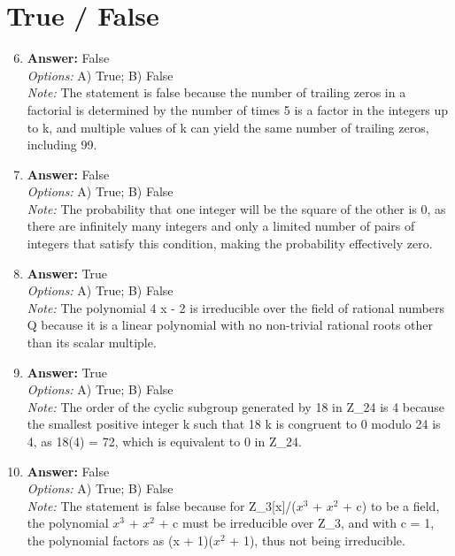 \documentclass[12pt]{article}
\begin{document}
\section*{True / False}
\begin{enumerate}[label=\arabic*.]
\setcounter{enumi}{5}
\item \textbf{Answer:} False
\\ \textit{Options:} A) True; B) False
\\ \textit{Note:} The statement is false because the number of trailing zeros in a factorial is determined by the number of times 5 is a factor in the integers up to k, and multiple values of k can yield the same number of trailing zeros, including 99.
\item \textbf{Answer:} False
\\ \textit{Options:} A) True; B) False
\\ \textit{Note:} The probability that one integer will be the square of the other is 0, as there are infinitely many integers and only a limited number of pairs of integers that satisfy this condition, making the probability effectively zero.
\item \textbf{Answer:} True
\\ \textit{Options:} A) True; B) False
\\ \textit{Note:} The polynomial 4 x - 2 is irreducible over the field of rational numbers Q because it is a linear polynomial with no non-trivial rational roots other than its scalar multiple.
\item \textbf{Answer:} True
\\ \textit{Options:} A) True; B) False
\\ \textit{Note:} The order of the cyclic subgroup generated by 18 in Z\_24 is 4 because the smallest positive integer k such that 18 k is congruent to 0 modulo 24 is 4, as 18(4) = 72, which is equivalent to 0 in Z\_24.
\item \textbf{Answer:} False
\\ \textit{Options:} A) True; B) False
\\ \textit{Note:} The statement is false because for Z\_3[x]/($x^3$ + $x^2$ + c) to be a field, the polynomial $x^3$ + $x^2$ + c must be irreducible over Z\_3, and with c = 1, the polynomial factors as (x + 1)($x^2$ + 1), thus not being irreducible.
\end{enumerate}
\end{document}
